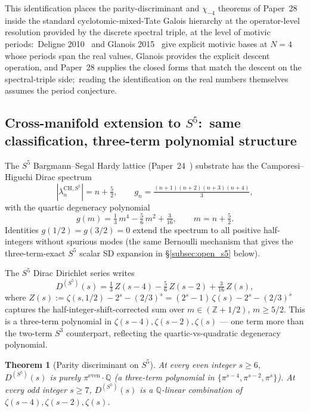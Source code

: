 \documentclass[11pt,a4paper]{article}
\theoremstyle{plain}
\newtheorem{theorem}{Theorem}[section]
\theoremstyle{definition}
\newcommand{\sthree}{S^{3}}
\newcommand{\sfive}{S^{5}}
\newcommand{\Z}{\mathbb{Z}}
\newcommand{\Q}{\mathbb{Q}}
\begin{document}
This identification places the parity-discriminant and $\chi_{-4}$
theorems of Paper~28 inside the standard cyclotomic-mixed-Tate Galois
hierarchy at the operator-level resolution provided by the discrete
spectral triple, at the level of motivic periods:\ Deligne
2010~\cite{deligne2010} and Glanois 2015~\cite{glanois2015} give
explicit motivic bases at $N = 4$ whose periods span the real values,
Glanois provides the explicit descent operation, and Paper~28 supplies
the closed forms that match the descent on the spectral-triple side;\
reading the identification on the real numbers themselves assumes the
period conjecture.

\subsection{Cross-manifold extension to $\sfive$:\ same classification,
three-term polynomial structure}
\label{subsec:m3_s5}

The $\sfive$ Bargmann--Segal Hardy lattice (Paper~24~\cite{loutey_paper24})
substrate has the Camporesi--Higuchi Dirac spectrum
\[
|\lambda_n^{\mathrm{CH},\sfive}| = n + \tfrac{5}{2}, \qquad
g_n = \tfrac{(n+1)(n+2)(n+3)(n+4)}{3},
\]
with the quartic degeneracy polynomial
\[
g(m) = \tfrac{1}{3}\,m^4 - \tfrac{5}{6}\,m^2 + \tfrac{3}{16},
\qquad m = n + \tfrac{5}{2}.
\]
Identities $g(1/2) = g(3/2) = 0$ extend the spectrum to all positive
half-integers without spurious modes (the same Bernoulli mechanism that
gives the three-term-exact $\sfive$ scalar SD expansion in
\S\ref{subsec:open_s5} below).

The $\sfive$ Dirac Dirichlet series writes
\begin{equation}
\label{eq:DS5}
D^{(\sfive)}(s) = \tfrac{1}{3}\,Z(s - 4) - \tfrac{5}{6}\,Z(s - 2) + \tfrac{3}{16}\,Z(s),
\end{equation}
where
$Z(s) := \zeta(s, 1/2) - 2^s - (2/3)^s
        = (2^s - 1)\,\zeta(s) - 2^s - (2/3)^s$
captures the half-integer-shift-corrected sum over $m \in (\Z + 1/2)$,
$m \ge 5/2$.  This is a three-term polynomial in
$\zeta(s-4), \zeta(s-2), \zeta(s)$ --- one term more than the two-term
$\sthree$ counterpart, reflecting the quartic-vs-quadratic degeneracy
polynomial.

\begin{theorem}[Parity discriminant on $\sfive$]
\label{thm:m3_s5_parity}
At every even integer $s \ge 6$, $D^{(\sfive)}(s)$ is purely
$\pi^{\mathrm{even}}\cdot\Q$ (a three-term polynomial in
$\{\pi^{s-4}, \pi^{s-2}, \pi^s\}$).  At every odd integer $s \ge 7$,
$D^{(\sfive)}(s)$ is a $\Q$-linear combination of
$\zeta(s-4), \zeta(s-2), \zeta(s)$.
\end{theorem}
\end{document}
